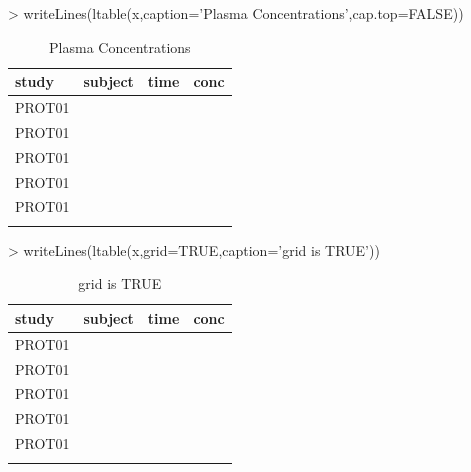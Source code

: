 \documentclass[titlepage]{article}
\begin{document}
\begin{Schunk}
\begin{Sinput}
> writeLines(ltable(x,caption='Plasma Concentrations',cap.top=FALSE))
\end{Sinput}
\begin{table}[!htpb]
 \begin{center}
  \begin{tabular}{lrrr}
    \hline \hline
   study & subject & time & conc \\ \hline
   PROT01 & \verb#1001# & \verb#0# & \verb#0.12# \\
   PROT01 & \verb#1001# & \verb#1# & \verb#34.00# \\
   PROT01 & \verb#1001# & \verb#2# & \verb#5.60# \\
   PROT01 & \verb#1002# & \verb#0# & \verb#0.50# \\
   PROT01 & \verb#1002# & \verb#1# & \verb#200.00# \\
    & \verb#1002# & \verb#2# & \verb## \\ \hline
  \end{tabular}
 \end{center}
 \caption[Plasma Concentrations]{Plasma Concentrations }
\end{table}\end{Schunk}
\begin{Schunk}
\begin{Sinput}
> writeLines(ltable(x,grid=TRUE,caption='grid is TRUE'))
\end{Sinput}
\begin{table}[!htpb]
 \caption[grid is TRUE]{grid is TRUE }
 \begin{center}
  \begin{tabular}{l|r|r|r}
    \hline \hline
   study & subject & time & conc \\ \hline
   PROT01 & \verb#1001# & \verb#0# & \verb#0.12# \\ \hline
   PROT01 & \verb#1001# & \verb#1# & \verb#34.00# \\ \hline
   PROT01 & \verb#1001# & \verb#2# & \verb#5.60# \\ \hline
   PROT01 & \verb#1002# & \verb#0# & \verb#0.50# \\ \hline
   PROT01 & \verb#1002# & \verb#1# & \verb#200.00# \\ \hline
    & \verb#1002# & \verb#2# & \verb## \\ \hline
  \end{tabular}
 \end{center}
\end{table}\end{Schunk}
\end{document}

